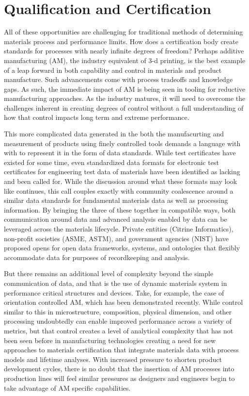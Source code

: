 \section{Qualification and Certification}
All of these opportunities are challenging for traditional methods of determining materials process and performance limits. How does a certification body create standards for processes with nearly infinite degrees of freedom? Perhaps additive manufacturing (AM), the industry equivalent of 3-d printing, is the best example of a leap forward in both capability and control in materials and product manufacture. Such advancements come with process tradeoffs and knowledge gaps\cite{Huang2015}. As such, the immediate impact of AM is being seen in tooling for reductive manufacturing approaches. As the industry matures, it will need to overcome the challenges inherent in creating degrees of control without a full understanding of how that control impacts long term and extreme performance\cite{Bikas2015}.

This more complicated data generated in the both the manufacurting and measurement of products using finely controlled tools demands a language with with to represent it in the form of data standards. While test certificates have existed for some time, even standardized data formats for electronic test certificates for engineering test data of materials have been identified as lacking and been called for\cite{Gagliardi2015357}. While the discussion around what these formats may look like continues, this call couples exactly with community coalescence around a similar data standards for fundamental materials data as well as processing information. By bringing the three of these together in compatible ways, both communication around data and advanced analysis enabled by data can be leveraged across the materials lifecycle. Private entities (Citrine Informatics), non-profit societies (ASME, ASTM), and government agencies (NIST) have proposed opens for open data frameworks, systems, and ontologies that flexibly accommodate data for purposes of recordkeeping and analysis\cite{Citrination,TheMineralsMetals&MaterialsSocietyTMS2015}. 

But there remains an additional level of complexity beyond the simple communication of data, and that is the use of dynamic materials system in performance critical structures and devices. Take, for example, the case of orientation controlled AM, which has been demonstrated recently\cite{DeHoff2015}. While control similar to this in microstructure, composition, physical dimension, and other processing undoubtedly can enable improved performance across a variety of metrics, but that control creates a level of analytical complexity that has not been seen before in manufacturing technologies creating a need for new approaches to materials certification that integrate materials data with process models and lifetime analyses. With increased pressure to shorten product development cycles, there is no doubt that the insertion of AM processes into production lines will feel similar pressures as designers and engineers begin to take advantage of AM specific capabilities\cite{Tyagi2015202}.
